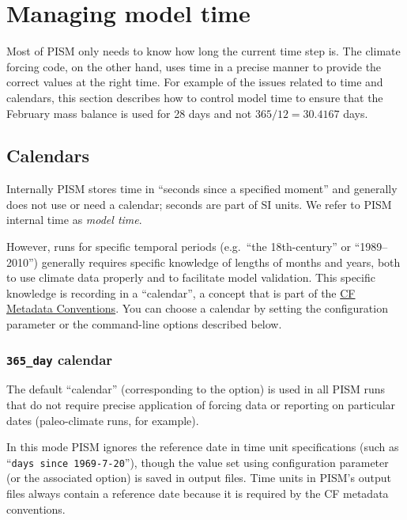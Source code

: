 \documentclass[titlepage,letterpaper,final]{scrartcl}
\begin{document}
\newpage
\section{Managing model time}
\label{sec:model-time}

Most of PISM only needs to know  how long the current time step is. The climate
forcing  code,  on  the other  hand,  uses  time in a precise manner
to provide the correct values at the right time.  For example of the issues related to time
and calendars, this section describes how to control model time to ensure
that the February mass balance is used for 28 days and not $365/12 = 30.4167$ days.


\subsection{Calendars}
\label{sec:calendars}

Internally PISM stores time in ``seconds since a specified moment'' and
generally does not use or need a calendar; seconds are part of SI units.
We refer to PISM internal time as \emph{model time}.

However, runs for specific temporal periods (e.g.~``the 18th-century'' or
``1989--2010'') generally requires specific knowledge of lengths of months
and years, both to use climate data properly and to facilitate model validation.
This specific knowledge is recording in a ``calendar'', a concept that
is part of the \href{http://cf-pcmdi.llnl.gov/documents/cf-conventions/1.6/cf-conventions.html}{CF Metadata Conventions}.
You can choose a calendar by setting the  configuration
parameter or the command-line options described below.

\subsubsection{\texttt{365_day} calendar}
\label{sec:365-day}

The default ``calendar'' (corresponding to the  option) is used in all PISM runs that do not require precise application of forcing data or reporting on particular dates (paleo-climate runs, for example).

In this mode PISM ignores the reference date in time unit specifications
(such as ``\texttt{days since 1969-7-20}''), though the value set using
 configuration parameter (or the associated option) is saved in
output files.  Time units in PISM's output files always contain a reference date
because it is required by the CF metadata conventions.
\end{document}
